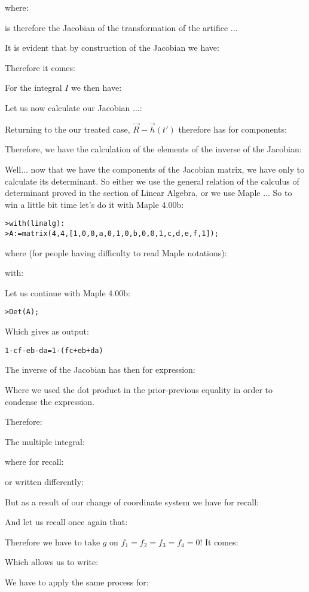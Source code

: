 	where:
	
	is therefore the Jacobian of the transformation of the artifice ...

	It is evident that by construction of the Jacobian we have:
	
	Therefore it comes:
	
	For the integral $I$ we then have:
	
	Let us now calculate our Jacobian ...:
	
	Returning to the our treated case, $\vec{R}-\vec{h}(t')$ therefore has for components:
	
	Therefore, we have the calculation of the elements of the inverse of the Jacobian:
	
	Well... now that we have the components of the Jacobian matrix, we have only to calculate its determinant. So either we use the general relation of the calculus of determinant proved in the section of Linear Algebra, or we use Maple ... So to win a little bit time let's do it with Maple 4.00b:
	
	\texttt{>with(linalg):\\
	>A:=matrix(4,4,[1,0,0,a,0,1,0,b,0,0,1,c,d,e,f,1]);}
	
	where (for people having difficulty to read Maple notations):
	
	with:
	
	Let us continue with Maple 4.00b:

	\texttt{>Det(A);}
	
	Which gives as output:

	\begin{center}
		\texttt{1-cf-eb-da=1-(fc+eb+da)}
	\end{center}
	The inverse of the Jacobian has then for expression:
	
	Where we used the dot product in the prior-previous equality in order to condense the expression.

	Therefore:
	
	The multiple integral:
	
	where for recall:
	
	or written differently:
	
	But as a result of our change of coordinate system we have for recall:	
	
	And let us recall once again that:
		
	Therefore we have to take $g$ on $f_1=f_2=f_3=f_4=0$! It comes:
	
	Which allows us to write:
	
	We have to apply the same process for:
	
